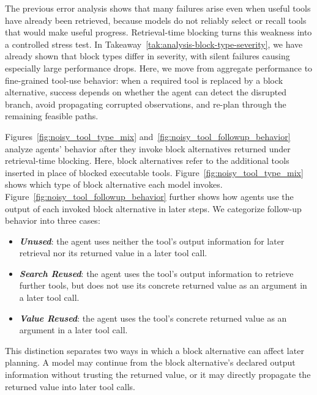 \documentclass{llmxive}
\begin{document}
The previous error analysis shows that many failures arise even when useful tools have already been retrieved, because models do not reliably select or recall tools that would make useful progress. Retrieval-time blocking turns this weakness into a controlled stress test. In Takeaway~\ref{tak:analysis-block-type-severity}, we have already shown that block types differ in severity, with silent failures causing especially large performance drops. Here, we move from aggregate performance to fine-grained tool-use behavior: when a required tool is replaced by a block alternative, success depends on whether the agent can detect the disrupted branch, avoid propagating corrupted observations, and re-plan through the remaining feasible paths.



Figures~\ref{fig:noisy_tool_type_mix} and~\ref{fig:noisy_tool_followup_behavior} analyze agents' behavior after they invoke block alternatives returned under retrieval-time blocking.
Here, block alternatives refer to the additional tools inserted in place of blocked executable tools.
Figure~\ref{fig:noisy_tool_type_mix} shows which type of block alternative each model invokes.
Figure~\ref{fig:noisy_tool_followup_behavior} further shows how agents use the output of each invoked block alternative in later steps.
We categorize follow-up behavior into three cases:
\begin{itemize}[topsep=2pt, partopsep=3pt, leftmargin=*, itemsep=-3pt]
\item \textbf{\textit{Unused}}: the agent uses neither the tool's output information for later retrieval nor its returned value in a later tool call.
\item \textbf{\textit{Search Reused}}: the agent uses the tool's output information to retrieve further tools, but does not use its concrete returned value as an argument in a later tool call.
\item \textbf{\textit{Value Reused}}: the agent uses the tool's concrete returned value as an argument in a later tool call.
\end{itemize}
This distinction separates two ways in which a block alternative can affect later planning.
A model may continue from the block alternative's declared output information without trusting the returned value, or it may directly propagate the returned value into later tool calls.
\end{document}
